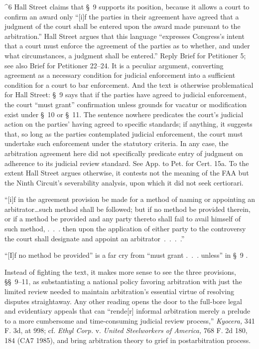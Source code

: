 ^6 Hall Street claims that \S~9 supports its position, because it
allows a court to confirm an award only ``[i]f the parties in their
agreement have agreed that a judgment of the court shall be entered
upon the award made pursuant to the arbitration.'' Hall Street argues
that this language ``expresses Congress's intent that a court must
enforce the agreement of the parties as to whether, and under what
circumstances, a judgment shall be entered.'' Reply Brief for
Petitioner 5; see also Brief for Petitioner 22--24. It is a peculiar
argument, converting agreement as a necessary condition for judicial
enforcement into a sufficient condition for a court to bar enforcement.
And the text is otherwise problematical for Hall Street: \S~9 says that
if the parties have agreed to judicial enforcement, the court ``must
grant'' confirmation unless grounds for vacatur or modification exist
under \S~10 or \S~11. The sentence nowhere predicates the court's
judicial action on the parties' having agreed to specific standards;
if anything, it suggests that, so long as the parties contemplated
judicial enforcement, the court must undertake such enforcement under
the statutory criteria. In any case, the arbitration agreement here
did not specifically predicate entry of judgment on adherence to its
judicial review standard. See App. to Pet. for Cert. 15a. To the
extent Hall Street argues otherwise, it contests not the meaning of the
FAA but the Ninth Circuit's severability analysis, upon which it did
not seek certiorari. \newpage 

    ``[i]f in the agreement provision be made for a method of naming or
    appointing an arbitrator\dots such method shall be followed; but
    if no method be provided therein, or if a method be provided and any
    party thereto shall fail to avail himself of such method, .~.~.
    then upon the application of either party to the controversy the
    court shall designate and appoint an arbitrator~.~.~.~.''

``[I]f no method be provided'' is a far cry from ``must grant .~.~.
unless'' in \S~9                                                     .

  Instead of fighting the text, it makes more sense to see the
three provisions, \S\S~9--11, as substantiating a national policy
favoring arbitration with just the limited review needed to maintain
arbitration's essential virtue of resolving disputes straightaway.
Any other reading opens the door to the full-bore legal and evidentiary
appeals that can ``rende[r] informal arbitration merely a prelude
to a more cumbersome and time-consuming judicial review process,''
\emph{Kyocera,} 341 F. 3d, at 998; cf. \emph{Ethyl Corp.} v. \emph{United
Steelworkers of America,} 768 F. 2d 180, 184 (CA7 1985), and bring
arbitration theory to grief in postarbitration process.

